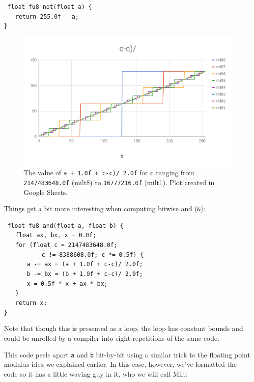 \documentclass{acmsiggraph}
\theoremstyle{remark}
\theoremstyle{definition}
\begin{document}
{\tt
float fu8\_not(float a) \{ \\
$\phantom{XX}$return 255.0f - a; \\
\}
}

\begin{figure}[tb!]
\includegraphics[width=\columnwidth]{milt.png}
\caption{\label{fig-milt-graph}
The value of {\tt a + 1.0f + c-c)/ 2.0f} for {\tt c} ranging from {\tt 2147483648.0f} (milt8) to {\tt 16777216.0f} (milt1).
{\small Plot created in Google Sheets.}
}\end{figure}

Things get a bit more interesting when computing bitwise and ({\tt \&}):

{\tt
float fu8\_and(float a, float b) \{ \\
$\phantom{XX}$float ax, bx, x = 0.0f; \\
$\phantom{XX}$for (float c = 2147483648.0f;\\
$\phantom{XXXXXX}$ c != 8388608.0f; c *= 0.5f) \{ \\
$\phantom{XXXX}$a -= ax = (a + 1.0f + c-c)/ 2.0f; \\
$\phantom{XXXX}$b -= bx = (b + 1.0f + c-c)/ 2.0f; \\
$\phantom{XXXX}$x = 0.5f * x + ax * bx; \\
$\phantom{XX}$\} \\
$\phantom{XX}$return x; \\
\}
}

Note that though this is presented as a loop, the loop has constant bounds and could be unrolled by a compiler into eight repetitions of the same code.

This code peels apart {\tt a} and {\tt b} bit-by-bit using a similar trick to the floating point modulus idea we explained earlier.
In this case, however, we've formatted the code so it has a little waving guy in it, who we will call Milt:
\end{document}
